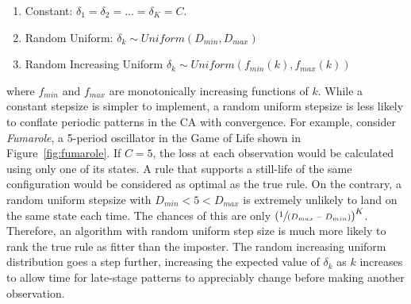 \begin{enumerate}
    \item Constant: $\delta_1 = \delta_2 = ... = \delta_K = C$.
    \item Random Uniform: $\delta_k \sim \mathit{Uniform}(D_{min}, D_{max})$
    \item Random Increasing Uniform $\delta_k \sim \mathit{Uniform}(f_{min}(k), f_{max}(k))$
\end{enumerate}

where $f_{min}$ and $f_{max}$ are monotonically increasing functions of $k$. While a constant stepsize is simpler to implement, a random uniform stepsize is less likely to conflate periodic patterns in the CA with convergence. For example, consider \textit{Fumarole}, a 5-period oscillator in the Game of Life shown in Figure~\ref{fig:fumarole}. If $C=5$, the loss at each observation would be calculated using only one of its states. A rule that supports a still-life of the same configuration would be considered as optimal as the true rule. On the contrary, a random uniform stepsize with $D_{min} < 5 < D_{max}$ is extremely unlikely to land on the same state each time. The chances of this are only $\left(\sfrac{1}{(D_{max} - D_{min})}\right)^K$. Therefore, an algorithm with random uniform step size is much more likely to rank the true rule as fitter than the imposter. The random increasing uniform distribution goes a step further, increasing the expected value of $\delta_k$ as $k$ increases to allow time for late-stage patterns to appreciably change before making another observation.

